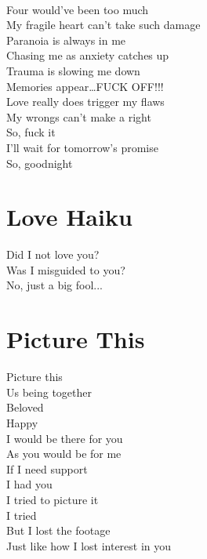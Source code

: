 \documentclass[12pt, b5paper]{article}
\begin{document}
\\Four would’ve been too much
\\My fragile heart can’t take such damage
\\Paranoia is always in me 
\\Chasing me as anxiety catches up 
\\Trauma is slowing me down
\\Memories appear…FUCK OFF!!!
\\Love really does trigger my flaws
\\My wrongs can’t make a right
\\So, fuck it
\\I’ll wait for tomorrow’s promise 
\\So, goodnight 

\newpage

\section{Love Haiku}
Did I not love you?
\\Was I misguided to you?
\\No, just a big fool...

\section{Picture This}
Picture this 
\\Us being together 
\\Beloved 
\\Happy 
\\I would be there for you
\\As you would be for me
\\If I need support 
\\I had you 
\\I tried to picture it 
\\I tried
\\But I lost the footage 
\\Just like how I lost interest in you


\newpage
\end{document}
